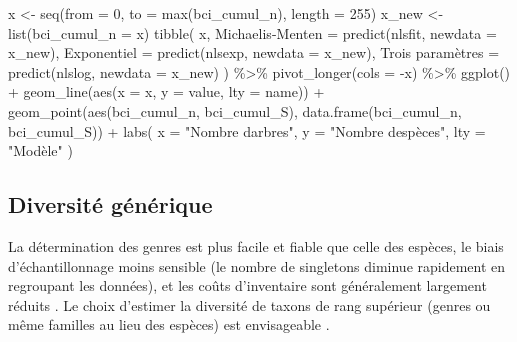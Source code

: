 \documentclass[
  11pt,
  american,
  a4paper,
  extrafontsizes,onecolumn,openright
  ]{memoir}
\newenvironment{Shaded}{\begin{snugshade}}{\end{snugshade}}
\newcommand{\AttributeTok}[1]{\textcolor[rgb]{0.77,0.63,0.00}{#1}}
\newcommand{\DecValTok}[1]{\textcolor[rgb]{0.00,0.00,0.81}{#1}}
\newcommand{\FunctionTok}[1]{\textcolor[rgb]{0.00,0.00,0.00}{#1}}
\newcommand{\NormalTok}[1]{#1}
\newcommand{\OtherTok}[1]{\textcolor[rgb]{0.56,0.35,0.01}{#1}}
\newcommand{\SpecialCharTok}[1]{\textcolor[rgb]{0.00,0.00,0.00}{#1}}
\newcommand{\StringTok}[1]{\textcolor[rgb]{0.31,0.60,0.02}{#1}}
\begin{document}
\begin{Shaded}
\begin{Highlighting}[]
\NormalTok{x }\OtherTok{\textless{}{-}} \FunctionTok{seq}\NormalTok{(}\AttributeTok{from =} \DecValTok{0}\NormalTok{, }\AttributeTok{to =} \FunctionTok{max}\NormalTok{(bci\_cumul\_n), }\AttributeTok{length =} \DecValTok{255}\NormalTok{)}
\NormalTok{x\_new }\OtherTok{\textless{}{-}} \FunctionTok{list}\NormalTok{(}\AttributeTok{bci\_cumul\_n =}\NormalTok{ x)}
\FunctionTok{tibble}\NormalTok{(}
\NormalTok{  x, }
  \StringTok{\textasciigrave{}}\AttributeTok{Michaelis{-}Menten}\StringTok{\textasciigrave{}} \OtherTok{=} \FunctionTok{predict}\NormalTok{(nlsfit, }\AttributeTok{newdata =}\NormalTok{ x\_new),}
  \StringTok{\textasciigrave{}}\AttributeTok{Exponentiel}\StringTok{\textasciigrave{}} \OtherTok{=} \FunctionTok{predict}\NormalTok{(nlsexp, }\AttributeTok{newdata =}\NormalTok{ x\_new),}
  \StringTok{\textasciigrave{}}\AttributeTok{Trois paramètres}\StringTok{\textasciigrave{}} \OtherTok{=} \FunctionTok{predict}\NormalTok{(nlslog, }\AttributeTok{newdata =}\NormalTok{ x\_new)}
\NormalTok{) }\SpecialCharTok{\%\textgreater{}\%} 
  \FunctionTok{pivot\_longer}\NormalTok{(}\AttributeTok{cols =} \SpecialCharTok{{-}}\NormalTok{x) }\SpecialCharTok{\%\textgreater{}\%} 
  \FunctionTok{ggplot}\NormalTok{() }\SpecialCharTok{+}
    \FunctionTok{geom\_line}\NormalTok{(}\FunctionTok{aes}\NormalTok{(}\AttributeTok{x =}\NormalTok{ x, }\AttributeTok{y =}\NormalTok{ value, }\AttributeTok{lty =}\NormalTok{ name)) }\SpecialCharTok{+}
    \FunctionTok{geom\_point}\NormalTok{(}\FunctionTok{aes}\NormalTok{(bci\_cumul\_n, bci\_cumul\_S), }\FunctionTok{data.frame}\NormalTok{(bci\_cumul\_n, bci\_cumul\_S)) }\SpecialCharTok{+}
    \FunctionTok{labs}\NormalTok{(}
      \AttributeTok{x =} \StringTok{"Nombre d\textquotesingle{}arbres"}\NormalTok{, }
      \AttributeTok{y =} \StringTok{"Nombre d\textquotesingle{}espèces"}\NormalTok{, }
      \AttributeTok{lty =} \StringTok{"Modèle"}
\NormalTok{    )}
\end{Highlighting}
\end{Shaded}

\normalsize

\hypertarget{diversituxe9-guxe9nuxe9rique}{%
\subsection{Diversité générique}\label{diversituxe9-guxe9nuxe9rique}}

La détermination des genres est plus facile et fiable que celle des espèces, le biais d'échantillonnage moins sensible (le nombre de singletons diminue rapidement en regroupant les données), et les coûts d'inventaire sont généralement largement réduits \autocite{Balmford1996b}.
Le choix d'estimer la diversité de taxons de rang supérieur (genres ou même familles au lieu des espèces) est envisageable \autocite{Williams1994}.
\end{document}
